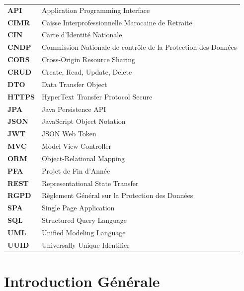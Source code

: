 \documentclass[12pt,a4paper,oneside]{report}
\begin{document}
\begin{tabular}{ll}
\textbf{API} & Application Programming Interface \\
\textbf{CIMR} & Caisse Interprofessionnelle Marocaine de Retraite \\
\textbf{CIN} & Carte d'Identité Nationale \\
\textbf{CNDP} & Commission Nationale de contrôle de la Protection des Données \\
\textbf{CORS} & Cross-Origin Resource Sharing \\
\textbf{CRUD} & Create, Read, Update, Delete \\
\textbf{DTO} & Data Transfer Object \\
\textbf{HTTPS} & HyperText Transfer Protocol Secure \\
\textbf{JPA} & Java Persistence API \\
\textbf{JSON} & JavaScript Object Notation \\
\textbf{JWT} & JSON Web Token \\
\textbf{MVC} & Model-View-Controller \\
\textbf{ORM} & Object-Relational Mapping \\
\textbf{PFA} & Projet de Fin d'Année \\
\textbf{REST} & Representational State Transfer \\
\textbf{RGPD} & Règlement Général sur la Protection des Données \\
\textbf{SPA} & Single Page Application \\
\textbf{SQL} & Structured Query Language \\
\textbf{UML} & Unified Modeling Language \\
\textbf{UUID} & Universally Unique Identifier \\
\end{tabular}

\tableofcontents
\listoffigures
\listoftables

\chapter*{Introduction Générale}
\end{document}

